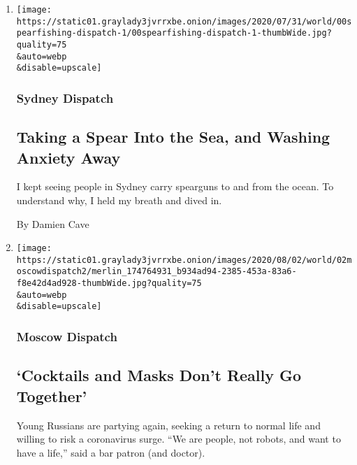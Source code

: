\begin{enumerate}
\def\labelenumi{\arabic{enumi}.}
\item
  \href{/2020/08/03/world/australia/spearfishing-sydney-coronavirus.html}{}

  \texttt{[image: https://static01.graylady3jvrrxbe.onion/images/2020/07/31/world/00spearfishing-dispatch-1/00spearfishing-dispatch-1-thumbWide.jpg?quality=75\\\&auto=webp\\\&disable=upscale]}

  \hypertarget{sydney-dispatch}{%
  \subsubsection{Sydney Dispatch}\label{sydney-dispatch}}

  \hypertarget{taking-a-spear-into-the-sea-and-washing-anxiety-away}{%
  \subsection{Taking a Spear Into the Sea, and Washing Anxiety
  Away}\label{taking-a-spear-into-the-sea-and-washing-anxiety-away}}

  I kept seeing people in Sydney carry spearguns to and from the ocean.
  To understand why, I held my breath and dived in.

  By Damien Cave
\item
  \href{/2020/08/01/world/europe/russia-moscow-coronavirus.html}{}

  \texttt{[image: https://static01.graylady3jvrrxbe.onion/images/2020/08/02/world/02moscowdispatch2/merlin\_174764931\_b934ad94-2385-453a-83a6-f8e42d4ad928-thumbWide.jpg?quality=75\\\&auto=webp\\\&disable=upscale]}

  \hypertarget{moscow-dispatch}{%
  \subsubsection{Moscow Dispatch}\label{moscow-dispatch}}

  \hypertarget{cocktails-and-masks-dont-really-go-together}{%
  \subsection{`Cocktails and Masks Don't Really Go
  Together'}\label{cocktails-and-masks-dont-really-go-together}}

  Young Russians are partying again, seeking a return to normal life and
  willing to risk a coronavirus surge. ``We are people, not robots, and
  want to have a life,'' said a bar patron (and doctor).


\end{enumerate}
